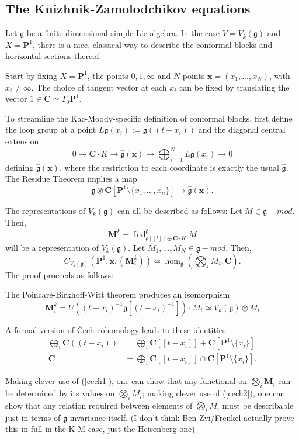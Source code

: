 \documentclass{article}
\newcommand{\CC}{\mathbold{C}}
\newcommand{\PP}{\mathbold{P}}
\newcommand{\MM}{\mathbold{M}}
\newcommand{\gf}{\mathfrak{g}}
\newcommand{\ghat}{\widehat{\mathfrak{g}}}
\newcommand{\xv}{\mathbold{x}}
\DeclareMathOperator{\Ind}{Ind}
\begin{document}
\subsection{The Knizhnik-Zamolodchikov equations}
Let $\gf$ be a finite-dimensional simple Lie algebra.  In the case $V=V_k(\gf)$ and $X=\PP^1$, there is a nice, classical way to describe the conformal blocks and horizontal sections thereof.

Start by fixing $X=\PP^1$, the points $0,1,\infty$ and $N$ points $\xv=(x_1,...,x_N)$, with $x_i \ne \infty$.  The choice of tangent vector at each $x_i$ can be fixed by translating the vector $1 \in \CC \simeq T_0\PP^1$.

To streamline the Kac-Moody-specific definition of conformal blocks, first define the loop group at a point $L\gf(x_i):=\gf((t-x_i))$ and the diagonal central extension
\[0 \rightarrow \CC \cdot K \rightarrow \ghat(\xv) \rightarrow \bigoplus_{i=1}^N L\gf(x_i) \rightarrow 0 \]
defining $\ghat(\xv)$, where the restriction to each coordinate is exactly the usual $\ghat$.  The Residue Theorem implies a map
\[\gf \otimes \CC[\PP^1 \setminus \{x_1,...,x_n\}] \rightarrow \ghat(\xv). \]

The representations of $V_k(\gf)$ can all be described as follows: Let $M \in \gf-mod$.  Then,
\[\MM^k=\Ind^{\ghat}_{\gf[[t]] \oplus \CC \cdot K}M \]
will be a representation of $V_k(\gf)$.  Let $M_1,...,M_N \in \gf-mod$.  Then,
\[C_{V_k(\gf)}(\PP^1,\xv,(\MM_i^k)) \simeq \hom_\gf\left(\bigotimes_i M_i,\CC \right). \]
The proof proceeds as follows:

The Poincaré-Birkhoff-Witt theorem produces an isomorphism
\[\MM_i^k=U((t-x_i)^{-1}\gf[(t-x_i)^{-1}]) \cdot M_i \simeq V_k(\gf) \otimes M_i \]

A formal version of Čech cohomology leads to these identities:
\begin{align}
  \bigoplus_i \CC((t-x_i)) &= \bigoplus_i \CC[[t-x_i]] + \CC[\PP^1 \setminus \{x_i\}]\label{cech1}\\
  \CC &= \bigoplus_i \CC[[t-x_i]] \cap \CC[\PP^1 \setminus \{x_i\}].\label{cech2}
\end{align}

Making clever use of (\ref{cech1}), one can show that any functional on $\bigotimes_i \MM_i$ can be determined by its values on $\bigotimes_i M_i$; making clever use of (\ref{cech2}), one can show that any relation required between elements of $\bigotimes_i M_i$ must be describable just in terms of $\gf$-invariance itself.
(I don't think Ben-Zvi/Frenkel actually prove this in full in the K-M case, just the Heisenberg one)
\end{document}
